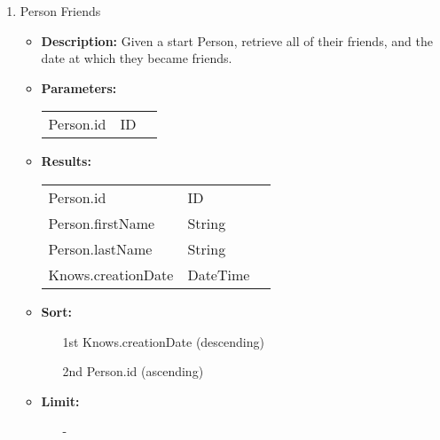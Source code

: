 {\begin{enumerate}
  \item Person Friends
    \begin{itemize}
      \item \textbf{Description:}
        Given a start Person, retrieve all of their friends, and the date at which they became friends.
      \item \textbf{Parameters:} \\
        \begin{tabular}{lll}
          Person.id 										& ID \\
        \end{tabular}
      \item \textbf{Results:} \\
        \begin{tabular}{lll}
          Person.id     									& ID \\
          Person.firstName     						& String \\
          Person.lastName    							& String \\
          Knows.creationDate    					& DateTime \\
        \end{tabular}
      \item \textbf{Sort:}
        \begin{itemize}
          \item[1st] Knows.creationDate (descending)
          \item[2nd] Person.id (ascending)
        \end{itemize}
            \item \textbf{Limit:}
                  \begin{itemize}
                    \item[] -
                  \end{itemize}
    \end{itemize}


\end{enumerate}}
